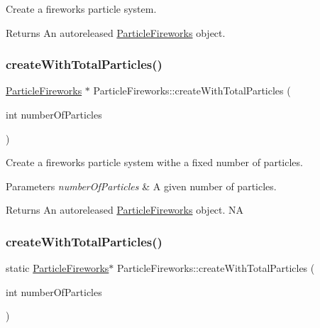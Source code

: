 Create a fireworks particle system.

\begin{DoxyReturn}{Returns}
An autoreleased \hyperlink{classParticleFireworks}{Particle\+Fireworks} object. 
\end{DoxyReturn}
\mbox{\label{classParticleFireworks_a8523caae9d6974160c0742196919ffbf}} 
\subsubsection{\texorpdfstring{create\+With\+Total\+Particles()}{createWithTotalParticles()}\hspace{0.1cm}{\footnotesize\ttfamily [1/2]}}
{\footnotesize\ttfamily \hyperlink{classParticleFireworks}{Particle\+Fireworks} $\ast$ Particle\+Fireworks\+::create\+With\+Total\+Particles (\begin{DoxyParamCaption}\item[{int}]{number\+Of\+Particles }\end{DoxyParamCaption})\hspace{0.3cm}{\ttfamily [static]}}

Create a fireworks particle system withe a fixed number of particles.


\begin{DoxyParams}{Parameters}
{\em number\+Of\+Particles} & A given number of particles. \\
\hline
\end{DoxyParams}
\begin{DoxyReturn}{Returns}
An autoreleased \hyperlink{classParticleFireworks}{Particle\+Fireworks} object.  NA 
\end{DoxyReturn}
\mbox{\label{classParticleFireworks_a1a28142b7f1415ef6607b32b3e4ae42b}} 
\subsubsection{\texorpdfstring{create\+With\+Total\+Particles()}{createWithTotalParticles()}\hspace{0.1cm}{\footnotesize\ttfamily [2/2]}}
{\footnotesize\ttfamily static \hyperlink{classParticleFireworks}{Particle\+Fireworks}$\ast$ Particle\+Fireworks\+::create\+With\+Total\+Particles (\begin{DoxyParamCaption}\item[{int}]{number\+Of\+Particles }\end{DoxyParamCaption})\hspace{0.3cm}{\ttfamily [static]}}


